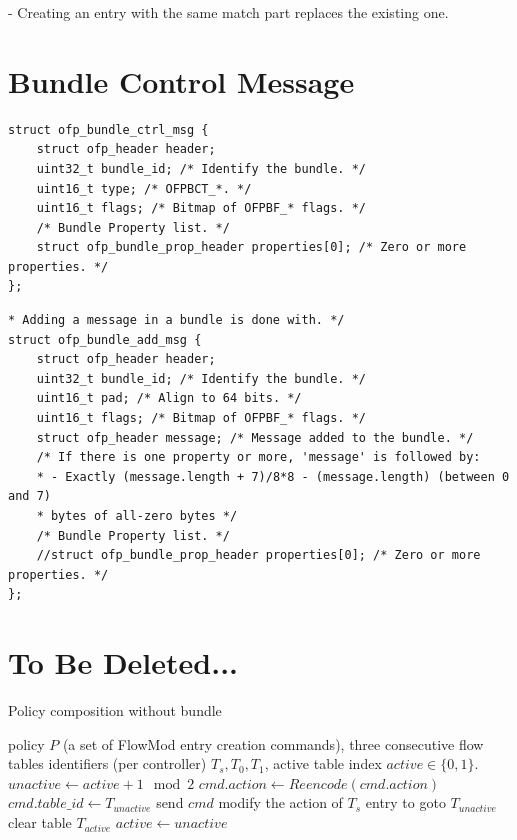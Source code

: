 \documentclass[conference]{sigcomm-alternate}
\begin{document}
{\begin{appendix}
- Creating an entry with the same match part replaces the existing one.

\section{Bundle Control Message}

\begin{lstlisting}
struct ofp_bundle_ctrl_msg {
	struct ofp_header header;
	uint32_t bundle_id; /* Identify the bundle. */
	uint16_t type; /* OFPBCT_*. */
	uint16_t flags; /* Bitmap of OFPBF_* flags. */
	/* Bundle Property list. */
	struct ofp_bundle_prop_header properties[0]; /* Zero or more properties. */
};
\end{lstlisting}

\begin{lstlisting}
* Adding a message in a bundle is done with. */
struct ofp_bundle_add_msg {
	struct ofp_header header;
	uint32_t bundle_id; /* Identify the bundle. */
	uint16_t pad; /* Align to 64 bits. */
	uint16_t flags; /* Bitmap of OFPBF_* flags. */
	struct ofp_header message; /* Message added to the bundle. */
	/* If there is one property or more, 'message' is followed by:
	* - Exactly (message.length + 7)/8*8 - (message.length) (between 0 and 7)
	* bytes of all-zero bytes */
	/* Bundle Property list. */
	//struct ofp_bundle_prop_header properties[0]; /* Zero or more properties. */
};
\end{lstlisting}

\section{To Be Deleted...}

\begin{algorithm}[h]
    \caption{Policy composition without bundle}
    \label{alg:wobundle}
    \begin{algorithmic}[1]
    \Require policy $P$ (a set of FlowMod entry creation commands), three consecutive flow tables identifiers (per controller) $T_s,T_0,T_1$, active table index $active\in\{0,1\}$.
    \State $unactive \gets active + 1 \mod{2}$
	    \State $cmd.action\gets Reencode(cmd.action)$
	    \State $cmd.table\_id\gets T_{unactive}$
	    \State send $cmd$
    \EndFor
    \State modify the action of $T_s$ entry to goto $T_{unactive}$
    \State clear table $T_{active}$
    \State $active \gets unactive$
	\Return


\end{algorithmic}
\end{algorithm}
\end{appendix}}
\end{document}
